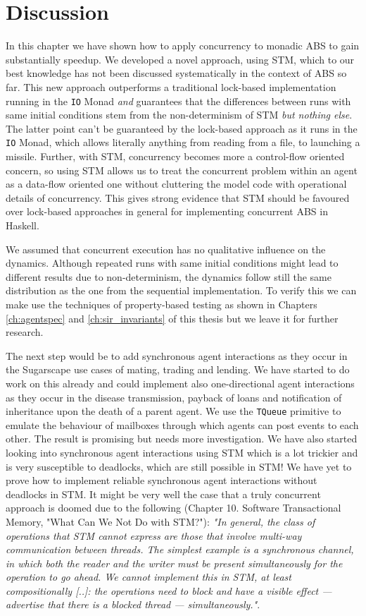 \section{Discussion}
In this chapter we have shown how to apply concurrency to monadic ABS to gain substantially speedup. We developed a novel approach, using STM, which to our best knowledge has not been discussed systematically in the context of ABS so far. This new approach outperforms a traditional lock-based implementation running in the \texttt{IO} Monad \textit{and} guarantees that the differences between runs with same initial conditions stem from the non-determinism of STM \textit{but nothing else}. The latter point can't be guaranteed by the lock-based approach as it runs in the \texttt{IO} Monad, which allows literally anything from reading from a file, to launching a missile. Further, with STM, concurrency becomes more a control-flow oriented concern, so using STM allows us to treat the concurrent problem within an agent as a data-flow oriented one without cluttering the model code with operational details of concurrency. This gives strong evidence that STM should be favoured over lock-based approaches in general for implementing concurrent ABS in Haskell.

We assumed that concurrent execution has no qualitative influence on the dynamics. Although repeated runs with same initial conditions might lead to different results due to non-determinism, the dynamics follow still the same distribution as the one from the sequential implementation. To verify this we can make use the techniques of property-based testing as shown in Chapters \ref{ch:agentspec} and \ref{ch:sir_invariants} of this thesis but we leave it for further research.

The next step would be to add synchronous agent interactions as they occur in the Sugarscape use cases of mating, trading and lending. We have started to do work on this already and could implement also one-directional agent interactions as they occur in the disease transmission, payback of loans and notification of inheritance upon the death of a parent agent. We use the \texttt{TQueue} primitive to emulate the behaviour of mailboxes through which agents can post events to each other. The result is promising but needs more investigation. We have also started looking into synchronous agent interactions using STM which is a lot trickier and is very susceptible to deadlocks, which are still possible in STM! We have yet to prove how to implement reliable synchronous agent interactions without deadlocks in STM. It might be very well the case that a truly concurrent approach is doomed due to the following \cite{marlow_parallel_2013} (Chapter 10. Software Transactional Memory, "What Can We Not Do with STM?"): \textit{"In general, the class of operations that STM cannot express are those that involve multi-way communication between threads. The simplest example is a synchronous channel, in which both the reader and the writer must be present simultaneously for the operation to go ahead. We cannot implement this in STM, at least compositionally [..]: the operations need to block and have a visible effect — advertise that there is a blocked thread — simultaneously."}. 

